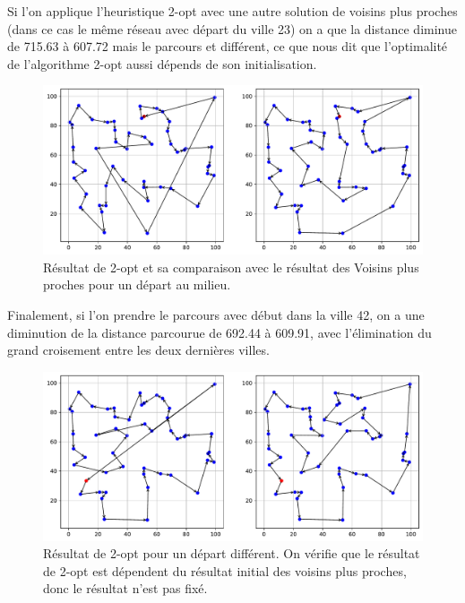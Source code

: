 \documentclass[a4paper,11pt,fleqn]{article}
\begin{document}
Si l'on applique l'heuristique 2-opt avec une autre solution de voisins plus proches (dans ce cas le même réseau avec départ du ville 23) on a que la distance diminue de 715.63 à 607.72 mais le parcours et différent, ce que nous dit que l'optimalité de l'algorithme 2-opt aussi dépends de son initialisation.

\begin{figure}[H]
    \centering
    \includegraphics[width=\textwidth]{images/2opt_50_villes_depart_23.pdf}
    \caption{Résultat de 2-opt et sa comparaison avec le résultat des Voisins plus proches pour un départ au milieu.}
    \label{fig:2opt-dep23}
\end{figure}

Finalement, si l'on prendre le parcours avec début dans la ville 42, on a une diminution de la distance parcourue de 692.44 à 609.91, avec l'élimination du grand croisement entre les deux dernières villes.

\begin{figure}[H]
    \centering
    \includegraphics[width=\textwidth]{images/2opt_50_villes_depart_42.pdf}
    \caption{Résultat de 2-opt pour un départ différent. On vérifie que le résultat de 2-opt est dépendent du résultat initial des voisins plus proches, donc le résultat n'est pas fixé.}
    \label{fig:2opt-dep42}
\end{figure}
\end{document}
